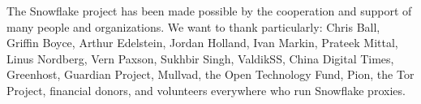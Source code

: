 \documentclass[letterpaper,twocolumn]{article}
\begin{document}
The Snowflake project has been made possible
by the cooperation and support of many people
and organizations.
We want to thank particularly:
Chris Ball, %
Griffin Boyce, %
Arthur Edelstein, %
Jordan Holland, %
Ivan Markin, %
Prateek Mittal, %
Linus Nordberg, %
Vern Paxson, %
Sukhbir Singh, %
ValdikSS, %
China Digital Times,
Greenhost, %
Guardian Project, %
Mullvad, %
the Open Technology Fund, %
Pion,
the Tor Project,
financial donors,
and volunteers everywhere who run Snowflake proxies.



\end{document}
